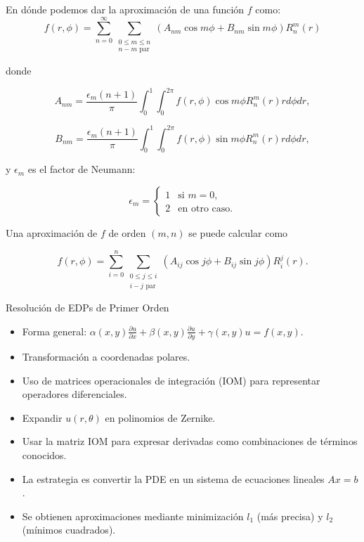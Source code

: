 \documentclass{beamer}
\begin{document}
\begin{frame}
  En dónde podemos dar la aproximación de una función $f$ como:
\[
f(r,\phi) = \sum_{n=0}^{\infty} \sum_{\substack{0 \leq m \leq n \\ n-m \text{ par}}} (A_{nm} \cos m\phi + B_{nm} \sin m\phi) R_n^m (r)
\]

donde

\[
A_{nm} = \frac{\epsilon_m (n+1)}{\pi} \int_0^1 \int_0^{2\pi} f(r,\phi) \cos m\phi R_n^m (r) r d\phi dr,
\]

\[
B_{nm} = \frac{\epsilon_m (n+1)}{\pi} \int_0^1 \int_0^{2\pi} f(r,\phi) \sin m\phi R_n^m (r) r d\phi dr,
\]

y \(\epsilon_m\) es el factor de Neumann:

\[
\epsilon_m = 
\begin{cases} 
1 & \text{si } m = 0, \\
2 & \text{en otro caso}.
\end{cases}
\]
\end{frame}

\begin{frame}
Una aproximación de \( f \) de orden \((m,n)\) se puede calcular como

\[
f(r,\phi) = \sum_{i=0}^{n} \sum_{\substack{0 \leq j \leq i \\ i-j \text{ par}}} (A_{ij} \cos j\phi + B_{ij} \sin j\phi) R_i^j (r).
\]
\end{frame}

\begin{frame}{Resolución de EDPs de Primer Orden}
    \begin{itemize}
        \item Forma general: $\alpha(x, y) \frac{\partial u}{\partial x} + \beta(x, y) \frac{\partial u}{\partial y} + \gamma(x, y) u = f(x, y)$.
        \item Transformación a coordenadas polares.
        \item Uso de matrices operacionales de integración (IOM) para representar operadores diferenciales.
        \item Expandir \( u(r, \theta) \) en polinomios de Zernike.
        \item Usar la matriz IOM para expresar derivadas como combinaciones de términos conocidos.
        \item La estrategia es convertir la PDE en un sistema de ecuaciones lineales \( Ax = b \).
        \item Se obtienen aproximaciones mediante minimización \( l_1 \) (más precisa) y \( l_2 \) (mínimos cuadrados).
    \end{itemize}
\end{frame}
\end{document}
